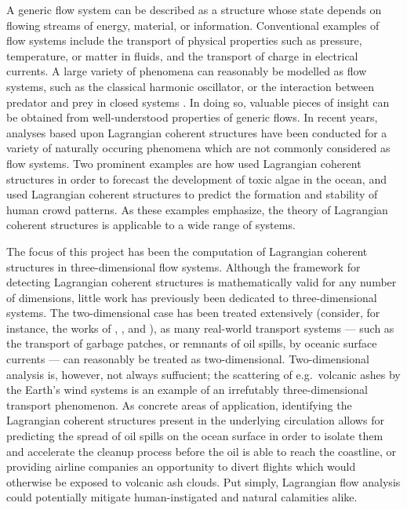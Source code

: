 A generic flow system can be described as a structure whose state depends on
flowing streams of energy, material, or information. Conventional examples of
flow systems include the transport of physical properties such as pressure,
temperature, or matter in fluids, and the transport of charge in electrical
currents. A large variety of phenomena can reasonably be modelled as flow
systems, such as the classical harmonic oscillator, or the interaction between
predator and prey in closed systems
\parencite[parts I--II]{strogatz2014nonlinear}. In doing so, valuable pieces
of insight can be obtained from well-understood properties of generic flows.
In recent years, analyses based upon Lagrangian coherent structures have been
conducted for a variety of naturally occuring phenomena which are not
commonly considered as flow systems. Two prominent examples are how
\textcite{olascoaga2008tracing} used Lagrangian coherent structures in order
to forecast the development of toxic algae in the ocean, and
\textcite{ali2007lagrangian} used Lagrangian coherent structures to predict
the formation and stability of human crowd patterns. As these examples
emphasize, the theory of Lagrangian coherent structures is applicable to a
wide range of systems.

The focus of this project has been the computation of Lagrangian coherent
structures in three-dimensional flow systems. Although the framework for
detecting Lagrangian coherent structures is mathematically valid for any number
of dimensions, little work has previously been dedicated to three-dimensional
systems. The two-dimensional case has been treated extensively (consider, for
instance, the works of \textcite{haller2000lagrangian},
\textcite{farazmand2012computing}, and \textcite{onu2015lcstool}), as many
real-world transport systems --- such as the transport of garbage patches, or
remnants of oil spills, by oceanic surface currents --- can reasonably be
treated as two-dimensional. Two-dimensional analysis is, however, not always
suffucient; the scattering of e.g.\ volcanic ashes by the Earth's wind systems
is an example of an irrefutably three-dimensional transport phenomenon.
As concrete areas of application, identifying the Lagrangian coherent
structures present in the underlying circulation allows for predicting the
spread of oil spills on the ocean surface in order to isolate them and
accelerate the cleanup process before the oil is able to reach the
coastline, or providing airline companies an opportunity to divert flights
which would otherwise be exposed to volcanic ash clouds. Put simply, Lagrangian
flow analysis could potentially mitigate human-instigated and natural
calamities alike.

